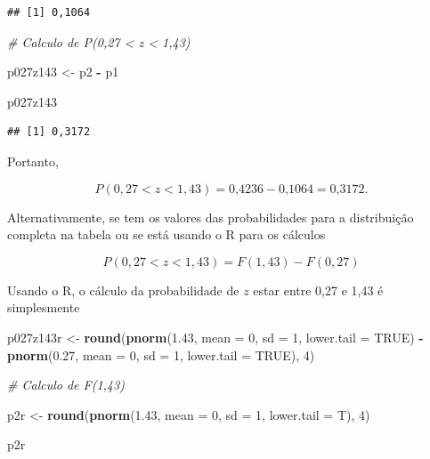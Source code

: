 \documentclass[
]{book}
\newenvironment{Shaded}{\begin{snugshade}}{\end{snugshade}}
\newcommand{\CommentTok}[1]{\textcolor[rgb]{0.56,0.35,0.01}{\textit{#1}}}
\newcommand{\DataTypeTok}[1]{\textcolor[rgb]{0.13,0.29,0.53}{#1}}
\newcommand{\DecValTok}[1]{\textcolor[rgb]{0.00,0.00,0.81}{#1}}
\newcommand{\FloatTok}[1]{\textcolor[rgb]{0.00,0.00,0.81}{#1}}
\newcommand{\KeywordTok}[1]{\textcolor[rgb]{0.13,0.29,0.53}{\textbf{#1}}}
\newcommand{\NormalTok}[1]{#1}
\newcommand{\OperatorTok}[1]{\textcolor[rgb]{0.81,0.36,0.00}{\textbf{#1}}}
\newcommand{\OtherTok}[1]{\textcolor[rgb]{0.56,0.35,0.01}{#1}}
\newcommand{\StringTok}[1]{\textcolor[rgb]{0.31,0.60,0.02}{#1}}
\begin{document}
\begin{verbatim}
## [1] 0,1064
\end{verbatim}

\begin{Shaded}
\begin{Highlighting}[]
\CommentTok{# Calculo de P(0,27 < z < 1,43)}

\NormalTok{p027z143 <-}\StringTok{ }\NormalTok{p2 }\OperatorTok{-}\StringTok{ }\NormalTok{p1}

\NormalTok{p027z143}
\end{Highlighting}
\end{Shaded}

\begin{verbatim}
## [1] 0,3172
\end{verbatim}

Portanto,

\[
  P(0,27 < z < 1,43) = \text{0,4236} - \text{0,1064} = \text{0,3172}.
\]

Alternativamente, se tem os valores das probabilidades para a distribuição completa na tabela ou se está usando o R para os cálculos

\[
  P(0,27 < z < 1,43) = F(1,43) - F(0,27)
\]

Usando o R, o cálculo da probabilidade de \(z\) estar entre 0,27 e 1,43 é simplesmente

\begin{Shaded}
\begin{Highlighting}[]
\NormalTok{p027z143r <-}\StringTok{ }\KeywordTok{round}\NormalTok{(}\KeywordTok{pnorm}\NormalTok{(}\FloatTok{1.43}\NormalTok{, }\DataTypeTok{mean =} \DecValTok{0}\NormalTok{, }\DataTypeTok{sd =} \DecValTok{1}\NormalTok{, }\DataTypeTok{lower.tail =} \OtherTok{TRUE}\NormalTok{) }\OperatorTok{-}\StringTok{ }
\StringTok{    }\KeywordTok{pnorm}\NormalTok{(}\FloatTok{0.27}\NormalTok{, }\DataTypeTok{mean =} \DecValTok{0}\NormalTok{, }\DataTypeTok{sd =} \DecValTok{1}\NormalTok{, }\DataTypeTok{lower.tail =} \OtherTok{TRUE}\NormalTok{), }
    \DecValTok{4}\NormalTok{)}

\CommentTok{# Calculo de F(1,43)}

\NormalTok{p2r <-}\StringTok{ }\KeywordTok{round}\NormalTok{(}\KeywordTok{pnorm}\NormalTok{(}\FloatTok{1.43}\NormalTok{, }\DataTypeTok{mean =} \DecValTok{0}\NormalTok{, }\DataTypeTok{sd =} \DecValTok{1}\NormalTok{, }\DataTypeTok{lower.tail =}\NormalTok{ T), }
    \DecValTok{4}\NormalTok{)}

\NormalTok{p2r}
\end{Highlighting}
\end{Shaded}
\end{document}
